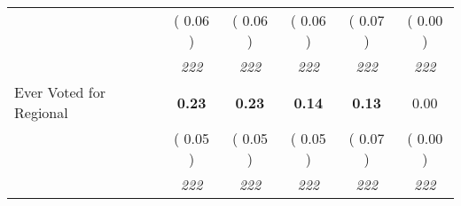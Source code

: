 \begin{tabular}{l c c c c c}
& (     0.06 ) & (     0.06 ) & (     0.06 ) & (     0.07 ) & (     0.00 ) \\
& \textit{ 222 } & \textit{ 222 } & \textit{ 222 } & \textit{ 222 } & \textit{ 222 } \\
Ever Voted for Regional & \textbf{      0.23 } & \textbf{      0.23 } & \textbf{      0.14 } & \textbf{     0.13} &      0.00 \\
& (     0.05 ) & (     0.05 ) & (     0.05 ) & (     0.07 ) & (     0.00 ) \\
& \textit{ 222 } & \textit{ 222 } & \textit{ 222 } & \textit{ 222 } & \textit{ 222 } \\
\bottomrule
\end{tabular}
